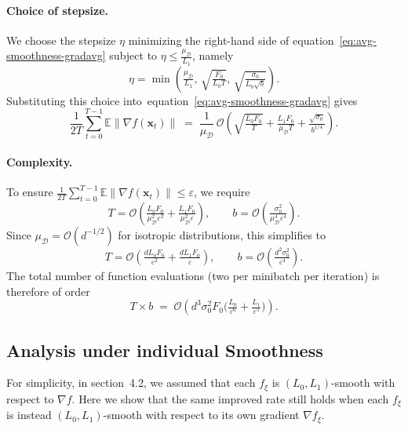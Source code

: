 \documentclass[twoside]{article}
\theoremstyle{plain}
\theoremstyle{definition}
\theoremstyle{remark}
\def\eqref#1{equation~\ref{#1}}
\def\cO{{\mathcal{O}}}
\def\cD{{\mathcal{D}}}
\def\vx{{\bm{x}}}
\newcommand{\E}{\mathbb{E}}
\begin{document}
\paragraph{Choice of stepsize.}
We choose the stepsize $\eta$ minimizing the right-hand side of
\eqref{eq:avg-smoothness-gradavg} subject to
$\eta \le \tfrac{\mu_\cD}{L_1}$, namely
\begin{equation}
\label{eq:avg-smoothness-eta}
\eta
= \min\!\left(
    \tfrac{\mu_\cD}{L_1},\,
    \sqrt{\tfrac{F_0}{L_0 T}},\,
    \sqrt{\tfrac{\sigma_0}{L_0\sqrt{b}}}
\right).
\end{equation}
Substituting this choice into~\eqref{eq:avg-smoothness-gradavg} gives
\begin{equation}
\label{eq:avg-smoothness-final}
\frac{1}{2T}\sum_{t=0}^{T-1} \E\|\nabla f(\vx_t)\|
\;=\;
\frac{1}{\mu_\cD}\,
\cO\!\left(
    \sqrt{\tfrac{L_0F_0}{T}}
    + \tfrac{L_1 F_0}{\mu_\cD T}
    + \tfrac{\sqrt{\sigma_0}}{b^{1/4}}
\right).
\end{equation}

\paragraph{Complexity.}
To ensure
$\tfrac{1}{2T}\sum_{t=0}^{T-1}\E\|\nabla f(\vx_t)\| \le \varepsilon$,
we require
\[
    T
    = \cO\!\left(
        \tfrac{L_0 F_0}{\mu_\cD^2 \varepsilon^2}
        + \tfrac{L_1 F_0}{\mu_\cD^2 \varepsilon}
    \right),
    \qquad
    b
    = \cO\!\left(
        \tfrac{\sigma_0^2}{\mu_\cD^4 \varepsilon^4}
    \right).
\]
Since $\mu_\cD = \cO(d^{-1/2})$ for isotropic distributions, this simplifies to
\[
    T
    = \cO\!\left(
        \tfrac{d L_0 F_0}{\varepsilon^2}
        + \tfrac{d L_1 F_0}{\varepsilon}
    \right),
    \qquad
    b
    = \cO\!\left(
        \tfrac{d^2 \sigma_0^2}{\varepsilon^4}
    \right).
\]
The total number of function evaluations (two per minibatch per iteration)
is therefore of order
\begin{equation}
\label{eq:avg-smoothness-complexity}
T \times b
\;=\;
\cO\!\left(
    d^3\sigma_0^2 F_0
    \Big(
        \tfrac{L_0}{\varepsilon^6}
        + \tfrac{L_1}{\varepsilon^5}
    \Big)
\right).
\end{equation}



\subsection{Analysis under individual Smoothness}\label{AppSec:IndSm}
For simplicity, in section~4.2, we assumed that each \(f_{\xi}\) is \((L_0,L_1)\)-smooth with respect to \(\nabla f\).
Here we show that the same improved rate still holds when each \(f_{\xi}\) is instead \((L_0,L_1)\)-smooth with respect to its own gradient \(\nabla f_{\xi}\).
\end{document}

